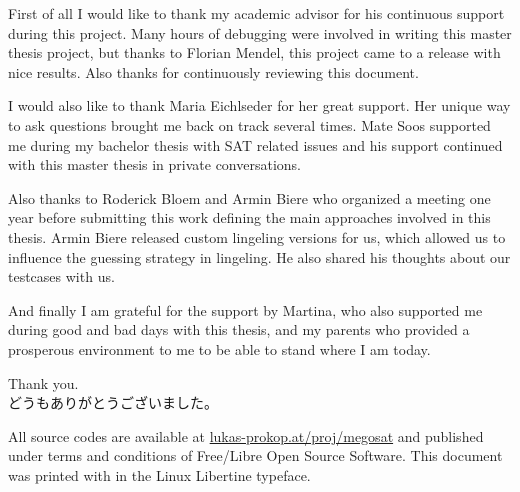 \documentclass[11pt,a4paper,final,oneside]{book}
\numberwithin{theorem}{chapter}
\numberwithin{defi}{chapter}
\numberwithin{prop}{chapter}
\begin{document}


\begin{acknowledgements}%
  \parskip5pt
  First of all I would like to thank my academic advisor for his continuous support
  during this project. Many hours of debugging were involved in writing this
  master thesis project, but thanks to Florian Mendel, this project came to a release
  with nice results. Also thanks for continuously reviewing this document.

  I would also like to thank Maria Eichlseder for her great support. Her unique
  way to ask questions brought me back on track several times.
  Mate Soos supported me during my bachelor thesis with SAT related issues
  and his support continued with this master thesis in private conversations.

  Also thanks to Roderick Bloem and Armin Biere who organized a meeting
  one year before submitting this work defining the main approaches involved
  in this thesis. Armin Biere released custom lingeling versions for us,
  which allowed us to influence the guessing strategy in lingeling.
  He also shared his thoughts about our testcases with us.

  And finally I am grateful for the support by Martina,
  who also supported me during good and bad days with this thesis,
  and my parents who provided a prosperous environment to me
  to be able to stand where I am today.

  Thank you. \\
  \indent どうもありがとうございました。
\end{acknowledgements}

All source codes are available at \href{http://lukas-prokop.at/proj/megosat}{lukas-prokop.at/proj/megosat}
and published under terms and conditions of Free/Libre Open Source Software.
This document was printed with \LuaLaTeX{} in the Linux Libertine typeface.

\tableofcontents
\mainmatter











\backmatter
\printbibliography
\end{document}
